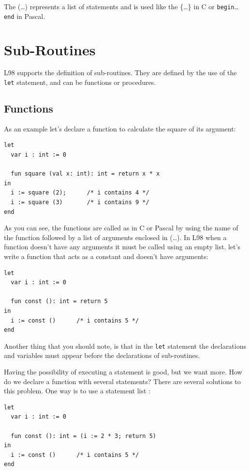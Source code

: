 \documentclass[a4paper, 11pt]{report}
\newcommand{\keyword}[1]{\texttt{#1}}
\begin{document}
The (\dots) represents a list of statements and is used like the \{\dots\} in C
or \keyword{begin}\dots\keyword{end} in Pascal.


\section{Sub-Routines}
L98 supports the definition of sub-routines. They are defined by the use of
the \keyword{let} statement, and can be functions or procedures.

\subsection{Functions}
As an example let's declare a function to calculate the square of its argument:

\begin{verbatim}
let
  var i : int := 0

  fun square (val x: int): int = return x * x
in
  i := square (2);      /* i contains 4 */
  i := square (3)       /* i contains 9 */ 
end
\end{verbatim}

As you can see, the functions are called as in C or Pascal by using the
name of the function followed by a list of arguments enclosed in (\dots). In
L98 when a function doesn't have any arguments it must be called using an
empty list. let's write a function that acts as a constant and doesn't have
arguments:

\begin{verbatim}
let
  var i : int := 0

  fun const (): int = return 5
in
  i := const ()      /* i contains 5 */
end
\end{verbatim}

Another thing that you should note, is that in the \keyword{let} statement the
declarations and variables must appear before the declarations of sub-routines.

Having the possibility of executing a statement is good, but we want more. How do
we declare a function with several statements? There are several solutions to this
problem. One way is to use a statement list :

\begin{verbatim}
let
  var i : int := 0

  fun const (): int = (i := 2 * 3; return 5)
in
  i := const ()      /* i contains 5 */
end
\end{verbatim}
\end{document}
